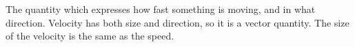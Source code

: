 The quantity which expresses how fast something is moving, and in 
what direction. Velocity has both size and direction, so it is a vector quantity.
The size of the velocity is the same as the speed.